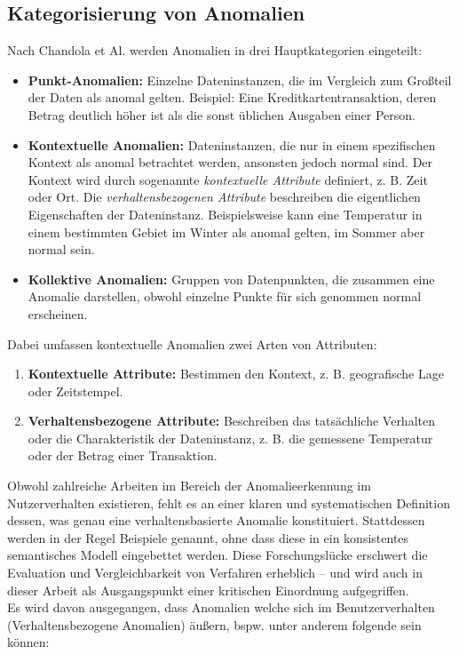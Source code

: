 \documentclass[a4paper,12pt]{article}
\begin{document}
	\subsection{Kategorisierung von Anomalien}
	Nach Chandola et Al. \cite[S.7]{chandola2009anomaly} werden Anomalien in drei Hauptkategorien eingeteilt:
	
	\begin{itemize}
		\item \textbf{Punkt-Anomalien:} Einzelne Dateninstanzen, die im Vergleich zum Großteil der Daten als anomal gelten. Beispiel: Eine Kreditkartentransaktion, deren Betrag deutlich höher ist als die sonst üblichen Ausgaben einer Person.
		\item \textbf{Kontextuelle Anomalien:} Dateninstanzen, die nur in einem spezifischen Kontext als anomal betrachtet werden, ansonsten jedoch normal sind. Der Kontext wird durch sogenannte \emph{kontextuelle Attribute} definiert, z. B. Zeit oder Ort. Die \emph{verhaltensbezogenen Attribute} beschreiben die eigentlichen Eigenschaften der Dateninstanz. Beispielsweise kann eine Temperatur in einem bestimmten Gebiet im Winter als anomal gelten, im Sommer aber normal sein.
		\item \textbf{Kollektive Anomalien:} Gruppen von Datenpunkten, die zusammen eine Anomalie darstellen, obwohl einzelne Punkte für sich genommen normal erscheinen.
	\end{itemize}
	Dabei umfassen kontextuelle Anomalien zwei Arten von Attributen:
	
	\begin{enumerate}
		\item \textbf{Kontextuelle Attribute:} Bestimmen den Kontext, z. B. geografische Lage oder Zeitstempel.
		\item \textbf{Verhaltensbezogene Attribute:} Beschreiben das tatsächliche Verhalten oder die Charakteristik der Dateninstanz, z. B. die gemessene Temperatur oder der Betrag einer Transaktion.
	\end{enumerate}
	
	Obwohl zahlreiche Arbeiten im Bereich der Anomalieerkennung im Nutzerverhalten existieren, fehlt es an einer klaren und systematischen Definition dessen, was genau eine verhaltensbasierte Anomalie konstituiert. Stattdessen werden in der Regel Beispiele genannt, ohne dass diese in ein konsistentes semantisches Modell eingebettet werden. Diese Forschungslücke erschwert die Evaluation und Vergleichbarkeit von Verfahren erheblich – und wird auch in dieser Arbeit als Ausgangspunkt einer kritischen Einordnung aufgegriffen.
	\\[0.5em]
	Es wird davon ausgegangen, dass Anomalien welche sich im Benutzerverhalten (Verhaltensbezogene Anomalien) äußern, bspw. unter anderem folgende sein können:
	
\end{document}
